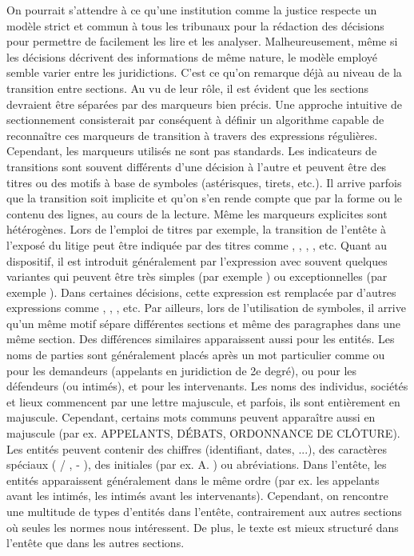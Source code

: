 On pourrait s'attendre à ce qu'une institution comme la justice respecte un modèle strict et commun à tous les tribunaux pour la rédaction des décisions pour permettre de facilement les lire et les analyser. Malheureusement, même si les  décisions décrivent des informations de même nature, le modèle employé semble varier entre les juridictions. C'est ce qu'on remarque déjà au niveau de la transition entre sections. Au vu de leur rôle, il est évident que les sections devraient être séparées par des marqueurs bien précis. Une approche intuitive de sectionnement consisterait par conséquent à définir un algorithme capable de reconnaître ces marqueurs de transition à travers des expressions régulières. Cependant, les marqueurs utilisés ne sont pas standards. Les indicateurs de transitions sont souvent différents d'une décision à l'autre et peuvent être des titres ou des motifs à base de symboles (astérisques, tirets, etc.). Il arrive parfois que la transition soit implicite et qu'on s'en rende compte que par la forme ou le contenu des lignes, au cours de la lecture. Même les marqueurs explicites sont hétérogènes. Lors de l'emploi de titres par exemple, la transition de l'entête à l'exposé du litige peut être indiquée par des titres comme  \fg{},  \fg{},  \fg{},  \fg{}, etc. Quant au dispositif, il est introduit généralement par l'expression  \fg{} avec souvent quelques variantes qui peuvent être très simples (par exemple  \fg{}) ou exceptionnelles (par exemple  \fg{}). Dans certaines décisions, cette expression est remplacée par d'autres expressions comme  \fg{},  \fg{},  \fg{}, etc. 
Par ailleurs, lors de l'utilisation de symboles, il arrive qu'un même motif sépare différentes sections et même des paragraphes dans une même section. Des différences similaires apparaissent aussi pour les entités. Les noms de parties sont généralement placés après un mot particulier comme   \fg{} ou  \fg{} pour les demandeurs (appelants en juridiction de 2e degré),  \fg{} ou  \fg{} pour les défendeurs (ou intimés), et   \fg{} pour les intervenants. Les noms des individus, sociétés et lieux commencent par une lettre majuscule, et parfois, ils sont entièrement en majuscule. Cependant, certains mots communs peuvent apparaître aussi en majuscule (par ex. {APPELANTS}, {DÉBATS}, {ORDONNANCE DE CLÔTURE}). Les entités peuvent contenir des chiffres (identifiant, dates, ...), des caractères spéciaux ( \og / \fg{},  \og - \fg{}), des initiales (par ex. \og A. \fg) ou abréviations.  Dans l'entête, les entités apparaissent généralement dans le même ordre (par ex. les appelants avant les intimés, les intimés avant les intervenants). Cependant, on rencontre une multitude de types d'entités dans l'entête, contrairement aux autres sections où seules les normes nous intéressent. De plus, le texte est mieux structuré dans l'entête que dans les autres sections.

